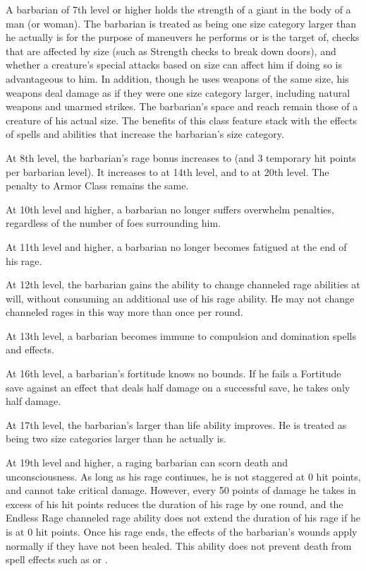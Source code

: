  A barbarian of 7th level or higher holds the strength of a giant in the body of a man (or woman). The barbarian is treated as being one size category larger than he actually is for the purpose of maneuvers he performs or is the target of, checks that are affected by size (such as Strength checks to break down doors), and whether a creature's special attacks based on size can affect him if doing so is advantageous to him. In addition, though he uses weapons of the same size, his weapons deal damage as if they were one size category larger, including natural weapons and unarmed strikes. The barbarian's space and reach remain those of a creature of his actual size. The benefits of this class feature stack with the effects of spells and abilities that increase the barbarian's size category.

 At 8th level, the barbarian's rage bonus increases to  (and 3 temporary hit points per barbarian level). It increases to  at 14th level, and to  at 20th level. The penalty to Armor Class remains the same.

 At 10th level and higher, a barbarian no longer suffers overwhelm penalties, regardless of the number of foes surrounding him.

 At 11th level and higher, a barbarian no longer becomes fatigued at the end of his rage.

 At 12th level, the barbarian gains the ability to change channeled rage abilities at will, without consuming an additional use of his rage ability. He may not change channeled rages in this way more than once per round.

 At 13th level, a barbarian becomes immune to compulsion and domination spells and effects.

 At 16th level, a barbarian's fortitude knows no bounds. If he fails a Fortitude save against an effect that deals half damage on a successful save, he takes only half damage.

 At 17th level, the barbarian's larger than life ability improves. He is treated as being two size categories larger than he actually is.

 At 19th level and higher, a raging barbarian can scorn death and unconsciousness. As long as his rage continues, he is not staggered at 0 hit points, and cannot take critical damage. However, every 50 points of damage he takes in excess of his hit points reduces the duration of his rage by one round, and the Endless Rage channeled rage ability does not extend the duration of his rage if he is at 0 hit points. Once his rage ends, the effects of the barbarian's wounds apply normally if they have not been healed. This ability does not prevent death from spell effects such as  or .

